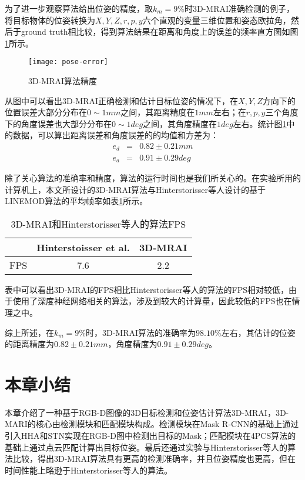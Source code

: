 为了进一步观察算法给出位姿的精度，取$k_m=9\%$时3D-MRAI准确检测的例子，将目标物体的位姿转换为$X,Y,Z,r,p,y$六个直观的变量三维位置和姿态欧拉角，然后于ground truth相比较，得到算法结果在距离和角度上的误差的频率直方图如图\ref{fig:pose-error}所示。
\begin{figure}[ht]
  \centering
  \texttt{[image: pose-error]}
  \caption{3D-MRAI算法精度}
  \label{fig:pose-error}
\end{figure}
从图中可以看出3D-MRAI正确检测和估计目标位姿的情况下，在$X,Y,Z$方向下的位置误差大部分分布在$0\sim 1mm$之间，其距离精度在$1mm$左右；在$r,p,y$三个角度下的角度误差也大部分分布在$0\sim 1deg$之间，其角度精度在$1deg$左右。统计图\ref{fig:pose-error}中的数据，可以算出距离误差和角度误差的的均值和方差为：
\begin{equation}
  \begin{array}{ccc}
    e_d &=& 0.82\pm0.21mm\\
    e_a &=& 0.91\pm0.29deg
  \end{array}
\end{equation}

除了关心算法的准确率和精度，算法的运行时间也是我们所关心的。在实验所用的计算机上，本文所设计的3D-MRAI算法与Hinterstorisser等人设计的基于LINEMOD算法的平均帧率如表\ref{tab:mrai-fps}所示。
\begin{table}[ht]
  \centering
  \caption{3D-MRAI和Hinterstorisser等人的算法FPS}
  \begin{tabular}{ccc}
    \toprule
    &Hinterstoisser et al.&\bf{3D-MRAI}\\
    \midrule
    FPS&7.6&2.2\\
    \bottomrule
  \end{tabular}
  \label{tab:mrai-fps}
\end{table}
表中可以看出3D-MRAI的FPS相比Hinterstorisser等人的算法的FPS相对较低，由于使用了深度神经网络相关的算法，涉及到较大的计算量，因此较低的FPS也在情理之中。

综上所述，在$k_m=9\%$时，3D-MRAI算法的准确率为$98.10\%$左右，其估计的位姿的距离精度为$0.82\pm0.21mm$，角度精度为$0.91\pm0.29deg$。

\section{本章小结}
本章介绍了一种基于RGB-D图像的3D目标检测和位姿估计算法3D-MRAI，3D-MARI的核心由检测模块和匹配模块构成。检测模块在Mask R-CNN的基础上通过引入HHA和STN实现在RGB-D图中检测出目标的Mask；匹配模块在4PCS算法的基础上通过点云匹配计算出目标位姿。最后还通过实验与Hinterstorisser等人的算法比较，得出3D-MRAI算法具有更高的检测准确率，并且位姿精度也更高，但在时间性能上略逊于Hinterstorisser等人的算法。

